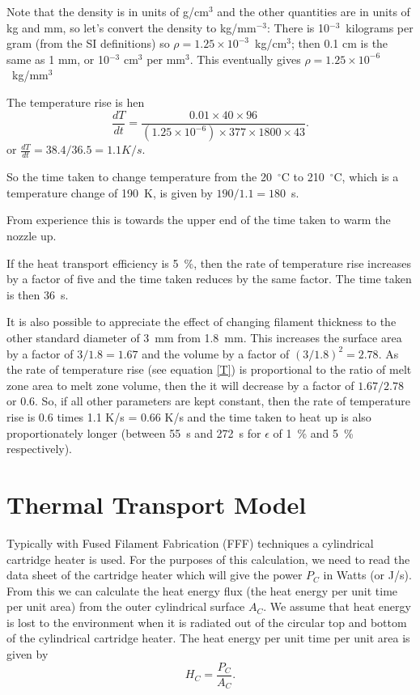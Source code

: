 Note that the density is in units of g/cm$^{3}$ and the other quantities are in units of kg and mm, so let's convert the density to kg/mm$^{-3}$: There is 10$^{-3}$~kilograms per gram (from the SI definitions) so $\rho = 1.25 \times 10^{-3}$~kg/cm$^{3}$; then 0.1 cm is the same as 1 mm, or 10$^{-3}$ cm$^{3}$ per mm$^{3}$. This eventually gives $\rho = 1.25 \times 10^{-6}$~kg/mm$^{3}$


The temperature rise is hen 
\begin{equation}
\frac{dT}{dt} = \frac{0.01 \times 40 \times 96 }{\left( 1.25 \times 10^{-6}\right) \times 377 \times 1800 \times 43}. 
\end{equation}
or $\frac{dT}{dt} = 38.4/36.5 = 1.1 K/s$.  

So the time taken to change temperature from the 20~$^{\circ}$C to 210~$^{\circ}$C, which is a temperature change of 190~K, is given by $190 / 1.1 = 180$~s. 

From experience this is towards the upper end of the time taken to warm the nozzle up. 

If the heat transport efficiency is 5~\%, then the rate of temperature rise increases by a factor of five and the time taken reduces by the same factor. The time taken is then 36~s.  

It is also possible to appreciate the effect of changing filament thickness to the other standard diameter of 3~mm from 1.8~mm. This increases the surface area by a factor of $3/1.8 = 1.67$ and the volume by a factor of $\left( 3/1.8 \right)^{2} = 2.78$. As the rate of temperature rise (see equation \ref{T}) is proportional to the ratio of melt zone area to melt zone volume, then the it will decrease by a factor of $1.67 / 2.78$ or 0.6. So, if all other parameters are kept constant, then the rate of temperature rise is 0.6 times 1.1 K/s = 0.66 K/s and the time taken to heat up is also proportionately longer (between 55~s and 272~s for $\epsilon$ of 1~\% and 5~\% respectively). 













%


\section{Thermal Transport Model}

Typically with Fused Filament Fabrication (FFF) techniques a cylindrical cartridge heater is used. For the purposes of this calculation, we need to read the data sheet of the cartridge heater which will give the power $P_{C}$ in Watts (or J/s). From this we can calculate the heat energy flux (the heat energy per unit time per unit area) from the outer cylindrical surface $A_{C}$. We assume that heat energy is lost to the environment when it is radiated out of the circular top and bottom of the cylindrical cartridge heater. The heat energy per unit time per unit area is given by 
\begin{equation}
H_{C} = \frac{P_{C}}{A_{C}}. 
\end{equation}

